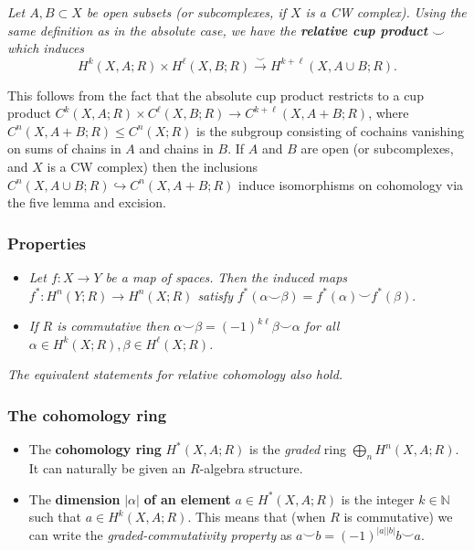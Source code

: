 \documentclass[10pt]{article}
\newcommand{\nn}{\mathbb{N}}
\begin{document}
                \emph{Let $A,B\subset X$ be open subsets (or subcomplexes, if $X$ is a CW complex).}
                \emph{Using the same definition as in the absolute case, we have the \textbf{relative cup product} $\smallsmile$ which induces}
                \begin{equation*}
                    H^k(X,A;R)\times H^\ell(X,B;R)\xrightarrow{\smallsmile}H^{k+\ell}(X,A\cup B;R).
                \end{equation*}

                This follows from the fact that the absolute cup product restricts to a cup product $C^k(X,A;R)\times C^\ell(X,B;R)\to C^{k+\ell}(X,A+B;R)$, where $C^n(X,A+B;R)\leqslant C^n(X;R)$ is the subgroup consisting of cochains vanishing on sums of chains in $A$ and chains in $B$.
                If $A$ and $B$ are open (or subcomplexes, and $X$ is a CW complex) then the inclusions $C^n(X,A\cup B;R)\hookrightarrow C^n(X,A+B;R)$ induce isomorphisms on cohomology via the five lemma and excision.

            \subsubsection{Properties}

                \begin{itemize}
                    \item \emph{Let $f\colon X\to Y$ be a map of spaces.}
                        \emph{Then the induced maps $f^*\colon H^n(Y;R)\to H^n(X;R)$ satisfy} $f^*(\alpha\smallsmile\beta)=f^*(\alpha)\smallsmile f^*(\beta).$
                    \item \emph{If $R$ is commutative then $\alpha\smallsmile\beta=(-1)^{k\ell}\beta\smallsmile\alpha$ for all $\alpha\in H^k(X;R),\beta\in H^\ell(X;R)$.}
                \end{itemize}

                \emph{The equivalent statements for relative cohomology also hold.}

            \subsubsection{The cohomology ring}

                \begin{itemize}
                    \item The \textbf{cohomology ring} $H^*(X,A;R)$ is the \emph{graded} ring $\bigoplus_n H^n(X,A;R)$.
                        It can naturally be given an $R$-algebra structure.
                    \item The \textbf{dimension} $|\alpha|$ \textbf{of an element} $a\in H^*(X,A;R)$ is the integer $k\in\nn$ such that $a\in H^k(X,A;R)$.
                        This means that (when $R$ is commutative) we can write the \emph{graded-commutativity property} as $a\smallsmile b=(-1)^{|a||b|}b\smallsmile a$.
                \end{itemize}
\end{document}
